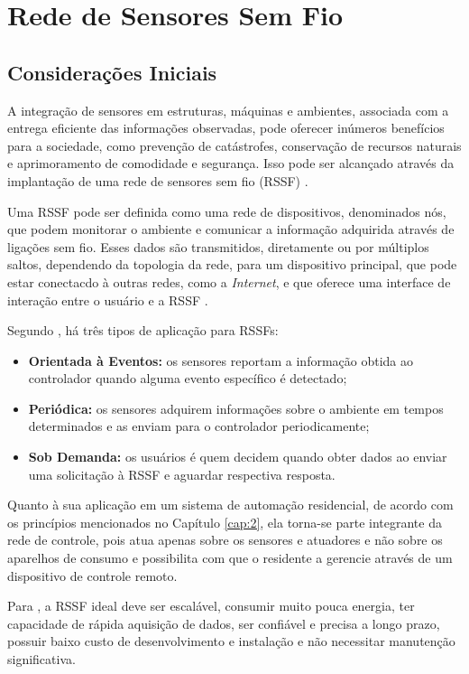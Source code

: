 \chapter{Rede de Sensores Sem Fio}
\label{cap:4}

\section{Considerações Iniciais}
A integração de sensores em estruturas, máquinas e ambientes, associada com a entrega eficiente das
informações observadas, pode oferecer inúmeros benefícios para a sociedade, como prevenção de catástrofes,
conservação de recursos naturais e aprimoramento de comodidade e segurança. Isso pode ser alcançado através
da implantação de uma rede de sensores sem fio (RSSF) \cite{townsend_arms2005}.

Uma RSSF pode ser definida como uma rede de dispositivos, denominados nós, que podem monitorar o ambiente e
comunicar a informação adquirida através de ligações sem fio. Esses dados são transmitidos, diretamente ou por
múltiplos saltos, dependendo da topologia da rede, para um dispositivo principal, que pode estar conectacdo à
outras redes, como a \textit{Internet}, e que oferece uma interface de interação entre o usuário e a RSSF
\cite{buratti2011}.

Segundo , há três tipos de aplicação para RSSFs:
\begin{itemize}
	\item \textbf{Orientada à Eventos:} os sensores reportam a informação obtida ao controlador quando alguma
	evento específico é detectado;
	\item \textbf{Periódica:} os sensores adquirem informações sobre o ambiente em tempos determinados e as enviam
	para o controlador periodicamente;
	\item \textbf{Sob Demanda:} os usuários é quem decidem quando obter dados ao enviar uma solicitação à RSSF e
	aguardar respectiva resposta.
\end{itemize}

Quanto à sua aplicação em um sistema de automação residencial, de acordo com os princípios mencionados no
Capítulo \ref{cap:2}, ela torna-se parte integrante da rede de controle, pois atua apenas sobre os sensores e
atuadores e não sobre os aparelhos de consumo e possibilita com que o residente a gerencie através de um
dispositivo de controle remoto.

Para \cite{townsend_arms2005}, a RSSF ideal deve ser escalável, consumir muito pouca energia, ter capacidade
de rápida aquisição de dados, ser confiável e precisa a longo prazo, possuir baixo custo de desenvolvimento e
instalação e não necessitar manutenção significativa.

